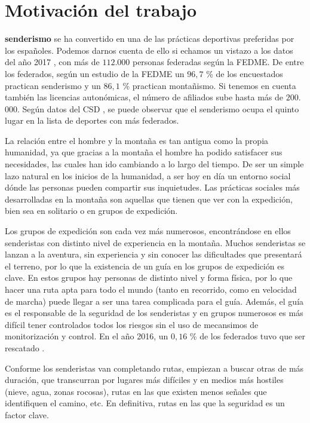 \chapter{Motivación del trabajo}
\label{chap:intro}

 \textbf{senderismo} se ha convertido en una de las prácticas deportivas preferidas por los españoles. Podemos darnos cuenta de ello si echamos un vistazo a los datos del año 2017 \cite{FED}, con más de $112$.$000$ personas federadas según la \ac{FEDME}. De entre los federados, según un estudio de la \ac{FEDME} \cite{2} un $96,7$ \% de los encuestados practican senderismo y un $86,1$ \% practican montañismo. Si tenemos en cuenta también las licencias autonómicas, el número de afiliados sube hasta más de $200$.$000$. Según datos del \ac{CSD} \cite{CSD}, se puede observar que el senderismo ocupa el quinto lugar en la lista de deportes con más federados.

La relación entre el hombre y la montaña \cite{11} es tan antigua como la propia humanidad, ya que gracias a la montaña el hombre ha podido satisfacer sus necesidades, las cuales han ido cambiando a lo largo del tiempo. De ser un simple lazo natural en los inicios de la humanidad, a ser hoy en día un entorno social dónde las personas pueden compartir sus inquietudes. Las prácticas sociales más desarrolladas en la montaña son aquellas que tienen que ver con la expedición, bien sea en solitario o en grupos de expedición.

Los grupos de expedición son cada vez más numerosos, encontrándose en ellos senderistas con distinto nivel de experiencia en la montaña. Muchos senderistas se lanzan a la aventura, sin experiencia y sin conocer las dificultades que presentará el terreno, por lo que la existencia de un guía en los grupos de expedición es clave. En estos grupos hay personas de distinto nivel y forma física, por lo que hacer una ruta apta para todo el mundo (tanto en recorrido, como en velocidad de marcha) puede llegar a ser una tarea complicada para el guía. Además, el guía es el responsable de la seguridad de los senderistas y en grupos numerosos es más difícil tener controlados todos los riesgos sin el uso de mecansimos de monitorización y control. En el año 2016, un $0,16$ \% de los federados tuvo que ser rescatado \cite{4}. 

Conforme los senderistas van completando rutas, empiezan a buscar otras de más duración, que transcurran por lugares más difíciles y en medios más hostiles (nieve, agua, zonas rocosas), rutas en las que existen menos señales que identifiquen el camino, etc. En definitiva, rutas en las que la seguridad es un factor clave. 

